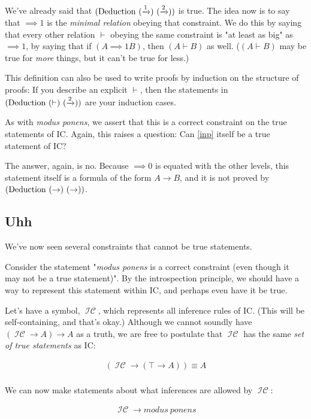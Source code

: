 \documentclass{article}
\begin{document}
  We've already said that $(\deduction\ (\implies{1})\ (\implies{2}))$ is true. The idea now is to say that $\implies{1}$ is the \emph{minimal relation} obeying that constraint. We do this by saying that every other relation $\vdash$ obeying the same constraint is "at least as big" as $\implies{1}$, by saying that if $(A \implies{1} B)$, then $(A \vdash B)$ as well. ($(A \vdash B)$ may be true for \emph{more} things, but it can't be true for less.)
  
  This definition can also be used to write proofs by induction on the structure of proofs: If you describe an explicit $\vdash$, then the statements in $(\deduction\ (\vdash)\ (\implies{2}))$ are your induction cases.
  
  As with \emph{modus ponens}, we assert that this is a correct constraint on the true statements of IC. Again, this raises a question: Can \eqref{inp} itself be a true statement of IC?
  
  The answer, again, is no. Because $\implies{0}$ is equated with the other levels, this statement itself is a formula of the form $A \to B$, and it is not proved by $(\deduction\ (\to)\ (\to))$.
  
  
  \subsection{Uhh}
  
  We've now seen several constraints that cannot be true statements.
  
  Consider the statement "\emph{modus ponens} is a correct constraint (even though it may not be a true statement)". By the introspection principle, we should have a way to represent this statement within IC, and perhaps even have it be true.
  
  \newcommand{\icset}{\operatorname{\mathcal{IC}}}
  Let's have a symbol, $\icset$, which represents all inference rules of IC. (This will be self-containing, and that's okay.) Although we cannot soundly have $(\icset \to A) \to A$ as a truth, we are free to postulate that $\icset$ has the same \emph{set of true statements} as IC:
  
  \begin{align*}
    (\icset \to (\top \to A)) \equiv A\\
  \end{align*}
  
  We can now make statements about what inferences are allowed by $\icset$:
  
  \begin{align*}
    \icset \to modus\ ponens\\
  \end{align*}
\end{document}
